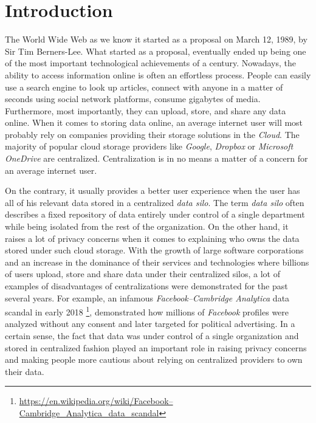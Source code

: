 \chapter*{Introduction}

The World Wide Web as we know it started as a proposal on March 12, 1989, by Sir Tim Berners-Lee. What started as a proposal, eventually ended up being one of the most important technological achievements of a century. Nowadays, the ability to access information online is often an effortless process. People can easily use a search engine to look up articles, connect with anyone in a matter of seconds using social network platforms, consume gigabytes of media. Furthermore, most importantly, they can upload, store, and share any data online. When it comes to storing data online, an average internet user will most probably rely on companies providing their storage solutions in the \textit{Cloud}. The majority of popular cloud storage providers like \textit{Google}, \textit{Dropbox} or \textit{Microsoft OneDrive} are centralized. Centralization is in no means a matter of a concern for an average internet user.

On the contrary, it usually provides a better user experience when the user has all of his relevant data stored in a centralized \textit{data silo}. The term \textit{data silo} often describes a fixed repository of data entirely under control of a single department while being isolated from the rest of the organization. On the other hand, it raises a lot of privacy concerns when it comes to explaining who owns the data stored under such cloud storage. With the growth of large software corporations and an increase in the dominance of their services and technologies where billions of users upload, store and share data under their centralized silos, a lot of examples of disadvantages of centralizations were demonstrated for the past several years. For example, an infamous \textit{Facebook–Cambridge Analytica} data scandal in early 2018 \footnote{\url{https://en.wikipedia.org/wiki/Facebook–Cambridge_Analytica_data_scandal}}, demonstrated how millions of \textit{Facebook} profiles were analyzed without any consent and later targeted for political advertising. In a certain sense, the fact that data was under control of a single organization and stored in centralized fashion played an important role in raising privacy concerns and making people more cautious about relying on centralized providers to own their data.

